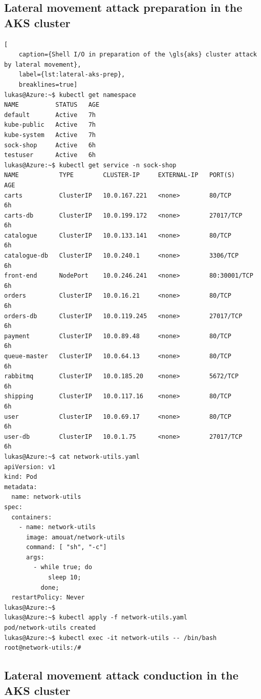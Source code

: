 \subsection{Lateral movement attack preparation in the AKS cluster}
\begin{lstlisting}[
	caption={Shell I/O in preparation of the \gls{aks} cluster attack by lateral movement},
	label={lst:lateral-aks-prep},
	breaklines=true]
lukas@Azure:~$ kubectl get namespace
NAME          STATUS   AGE
default       Active   7h
kube-public   Active   7h
kube-system   Active   7h
sock-shop     Active   6h
testuser      Active   6h
lukas@Azure:~$ kubectl get service -n sock-shop
NAME           TYPE        CLUSTER-IP     EXTERNAL-IP   PORT(S)        AGE
carts          ClusterIP   10.0.167.221   <none>        80/TCP         6h
carts-db       ClusterIP   10.0.199.172   <none>        27017/TCP      6h
catalogue      ClusterIP   10.0.133.141   <none>        80/TCP         6h
catalogue-db   ClusterIP   10.0.240.1     <none>        3306/TCP       6h
front-end      NodePort    10.0.246.241   <none>        80:30001/TCP   6h
orders         ClusterIP   10.0.16.21     <none>        80/TCP         6h
orders-db      ClusterIP   10.0.119.245   <none>        27017/TCP      6h
payment        ClusterIP   10.0.89.48     <none>        80/TCP         6h
queue-master   ClusterIP   10.0.64.13     <none>        80/TCP         6h
rabbitmq       ClusterIP   10.0.185.20    <none>        5672/TCP       6h
shipping       ClusterIP   10.0.117.16    <none>        80/TCP         6h
user           ClusterIP   10.0.69.17     <none>        80/TCP         6h
user-db        ClusterIP   10.0.1.75      <none>        27017/TCP      6h
lukas@Azure:~$ cat network-utils.yaml
apiVersion: v1
kind: Pod
metadata:
  name: network-utils
spec:
  containers:
    - name: network-utils
      image: amouat/network-utils
      command: [ "sh", "-c"]
      args:
        - while true; do
            sleep 10;
          done;
  restartPolicy: Never
lukas@Azure:~$
lukas@Azure:~$ kubectl apply -f network-utils.yaml
pod/network-utils created
lukas@Azure:~$ kubectl exec -it network-utils -- /bin/bash
root@network-utils:/#
\end{lstlisting}

\subsection{Lateral movement attack conduction in the AKS cluster}

